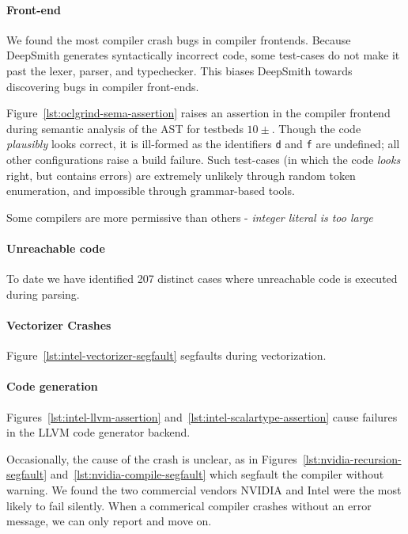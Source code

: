 \paragraph{Front-end} We found the most compiler crash bugs in compiler frontends. Because DeepSmith generates syntactically incorrect code, some test-cases do not make it past the lexer, parser, and typechecker. This biases DeepSmith towards discovering bugs in compiler front-ends.

Figure~\ref{lst:oclgrind-sema-assertion} raises an assertion in the compiler frontend during semantic analysis of the AST for testbeds $10\pm$. Though the code \emph{plausibly} looks correct, it is ill-formed as the identifiers \texttt{d} and \texttt{f} are undefined; all other configurations raise a build failure. Such test-cases (in which the code \emph{looks} right, but contains errors) are extremely unlikely through random token enumeration, and impossible through grammar-based tools.

 Some compilers are more permissive than others - \emph{integer literal is too large}

\paragraph{Unreachable code} To date we have identified 207 distinct cases where unreachable code is executed during parsing. 

\paragraph{Vectorizer Crashes} Figure~\ref{lst:intel-vectorizer-segfault} segfaults during vectorization. 

\paragraph{Code generation} Figures~\ref{lst:intel-llvm-assertion} and~\ref{lst:intel-scalartype-assertion} cause failures in the LLVM code generator backend.

Occasionally, the cause of the crash is unclear, as in Figures~\ref{lst:nvidia-recursion-segfault} and~\ref{lst:nvidia-compile-segfault} which segfault the compiler without warning. We found the two commercial vendors NVIDIA and Intel were the most likely to fail silently. When a commerical compiler crashes without an error message, we can only report and move on.


